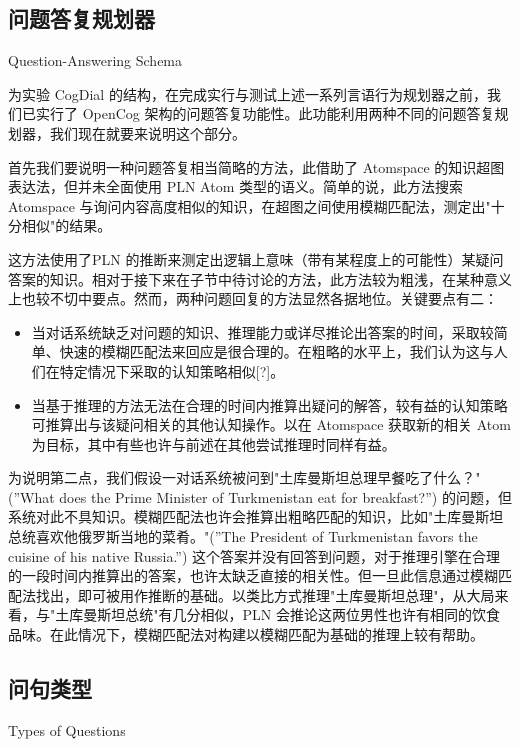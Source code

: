 \subsection{问题答复规划器}{Question-Answering Schema}
\label{sec:QA}

为实验 CogDial 的结构，在完成实行与测试上述一系列言语行为规划器之前，我们已实行了 OpenCog 架构的问题答复功能性。此功能利用两种不同的问题答复规划器，我们现在就要来说明这个部分。

首先我们要说明一种问题答复相当简略的方法，此借助了 Atomspace 的知识超图表达法，但并未全面使用 PLN Atom 类型的语义。简单的说，此方法搜索 Atomspace 与询问内容高度相似的知识，在超图之间使用模糊匹配法，测定出"十分相似"的结果。 

这方法使用了PLN 的推断来测定出逻辑上意味（带有某程度上的可能性）某疑问答案的知识。相对于接下来在子节中待讨论的方法，此方法较为粗浅，在某种意义上也较不切中要点。然而，两种问题回复的方法显然各据地位。关键要点有二：

\begin{itemize}
\item 当对话系统缺乏对问题的知识、推理能力或详尽推论出答案的时间，采取较简单、快速的模糊匹配法来回应是很合理的。在粗略的水平上，我们认为这与人们在特定情况下采取的认知策略相似[?]。 
\item 当基于推理的方法无法在合理的时间内推算出疑问的解答，较有益的认知策略可推算出与该疑问相关的其他认知操作。以在 Atomspace 获取新的相关 Atom 为目标，其中有些也许与前述在其他尝试推理时同样有益。
\end{itemize}

为说明第二点，我们假设一对话系统被问到"土库曼斯坦总理早餐吃了什么？"(”What does the Prime Minister of Turkmenistan eat for breakfast?”) 的问题，但系统对此不具知识。模糊匹配法也许会推算出粗略匹配的知识，比如"土库曼斯坦总统喜欢他俄罗斯当地的菜肴。"(”The President of Turkmenistan favors the cuisine of his native Russia.”) 这个答案并没有回答到问题，对于推理引擎在合理的一段时间内推算出的答案，也许太缺乏直接的相关性。但一旦此信息通过模糊匹配法找出，即可被用作推断的基础。以类比方式推理"土库曼斯坦总理"，从大局来看，与"土库曼斯坦总统"有几分相似，PLN 会推论这两位男性也许有相同的饮食品味。在此情况下，模糊匹配法对构建以模糊匹配为基础的推理上较有帮助。


\subsection{问句类型}{Types of Questions}

